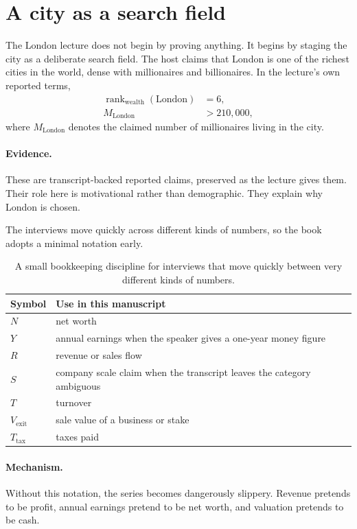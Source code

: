 \documentclass[11pt,oneside]{book}
\begin{document}
\section{A city as a search field}

The London lecture does not begin by proving anything. It begins by staging the city as a deliberate search field. The host claims that London is one of the richest cities in the world, dense with millionaires and billionaires. In the lecture's own reported terms,
\begin{align}
\operatorname{rank}_{\text{wealth}}(\text{London}) &= 6,\\
M_{\text{London}} &> 210{,}000,
\end{align}
where \(M_{\text{London}}\) denotes the claimed number of millionaires living in the city.

\paragraph{Evidence.} These are transcript-backed reported claims, preserved as the lecture gives them. Their role here is motivational rather than demographic. They explain why London is chosen.

The interviews move quickly across different kinds of numbers, so the book adopts a minimal notation early.

\begin{table}[h]
\centering
\begin{tabular}{|l|p{}|}
\hline
Symbol & Use in this manuscript \\
\hline
\(N\) & net worth \\
\hline
\(Y\) & annual earnings when the speaker gives a one-year money figure \\
\hline
\(R\) & revenue or sales flow \\
\hline
\(S\) & company scale claim when the transcript leaves the category ambiguous \\
\hline
\(T\) & turnover \\
\hline
\(V_{\mathrm{exit}}\) & sale value of a business or stake \\
\hline
\(T_{\mathrm{tax}}\) & taxes paid \\
\hline
\end{tabular}
\caption{A small bookkeeping discipline for interviews that move quickly between very different kinds of numbers.}
\end{table}

\paragraph{Mechanism.} Without this notation, the series becomes dangerously slippery. Revenue pretends to be profit, annual earnings pretend to be net worth, and valuation pretends to be cash.
\end{document}
